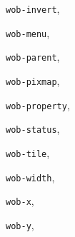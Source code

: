 \begin{theindex}
\item {\tt wob-invert}, {\bf\pageref{wob-invert}}
\item {\tt wob-menu}, {\bf\pageref{wob-menu}}
\item {\tt wob-parent}, {\bf\pageref{wob-parent}}
\item {\tt wob-pixmap}, {\bf\pageref{wob-pixmap}}
\item {\tt wob-property}, {\bf\pageref{wob-property}}
\item {\tt wob-status}, {\bf\pageref{wob-status}}
\item {\tt wob-tile}, {\bf\pageref{wob-tile}}
\item {\tt wob-width}, {\bf\pageref{wob-width}}
\item {\tt wob-x}, {\bf\pageref{wob-x}}
\item {\tt wob-y}, {\bf\pageref{wob-y}}
\end{theindex}
